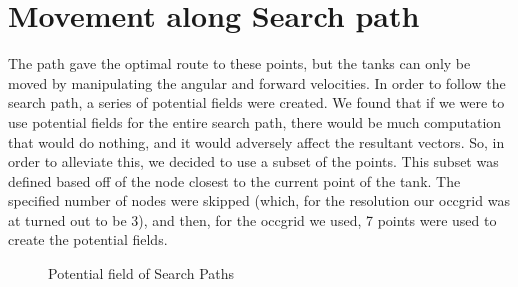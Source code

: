 \documentclass{article}
\begin{document}
\section{Movement along Search path}
The path gave the optimal route to these points, but the tanks can only be moved by manipulating the angular and forward velocities.  In order to follow the search path, a series of potential fields were created.  We found that if we were to use potential fields for the entire search path, there would be much computation that would do nothing, and it would adversely affect the resultant vectors.  So, in order to alleviate this, we decided to use a subset of the points.  This subset was defined based off of the node closest to the current point of the tank.  The specified number of nodes were skipped (which, for the resolution our occgrid was at turned out to be 3), and then, for the occgrid we used, 7 points were used to create the potential fields.  
\begin{figure}[h!tb]
	\caption{Potential field of Search Paths}
\end{figure}
\end{document}

